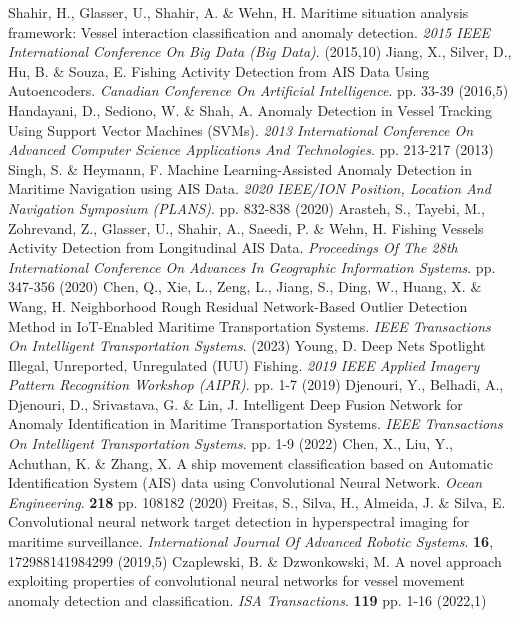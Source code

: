 Shahir, H., Glasser, U., Shahir, A. \& Wehn, H. Maritime situation analysis framework: Vessel interaction classification and anomaly detection. {\em 2015 IEEE International Conference On Big Data (Big Data)}. (2015,10)
Jiang, X., Silver, D., Hu, B. \& Souza, E. Fishing Activity Detection from AIS Data Using Autoencoders. {\em Canadian Conference On Artificial Intelligence}. pp. 33-39 (2016,5)
Handayani, D., Sediono, W. \& Shah, A. Anomaly Detection in Vessel Tracking Using Support Vector Machines (SVMs). {\em 2013 International Conference On Advanced Computer Science Applications And Technologies}. pp. 213-217 (2013)
Singh, S. \& Heymann, F. Machine Learning-Assisted Anomaly Detection in Maritime Navigation using AIS Data. {\em 2020 IEEE/ION Position, Location And Navigation Symposium (PLANS)}. pp. 832-838 (2020)
Arasteh, S., Tayebi, M., Zohrevand, Z., Glasser, U., Shahir, A., Saeedi, P. \& Wehn, H. Fishing Vessels Activity Detection from Longitudinal AIS Data. {\em Proceedings Of The 28th International Conference On Advances In Geographic Information Systems}. pp. 347-356 (2020)
Chen, Q., Xie, L., Zeng, L., Jiang, S., Ding, W., Huang, X. \& Wang, H. Neighborhood Rough Residual Network-Based Outlier Detection Method in IoT-Enabled Maritime Transportation Systems. {\em IEEE Transactions On Intelligent Transportation Systems}. (2023)
Young, D. Deep Nets Spotlight Illegal, Unreported, Unregulated (IUU) Fishing. {\em 2019 IEEE Applied Imagery Pattern Recognition Workshop (AIPR)}. pp. 1-7 (2019)
Djenouri, Y., Belhadi, A., Djenouri, D., Srivastava, G. \& Lin, J. Intelligent Deep Fusion Network for Anomaly Identification in Maritime Transportation Systems. {\em IEEE Transactions On Intelligent Transportation Systems}. pp. 1-9 (2022)
Chen, X., Liu, Y., Achuthan, K. \& Zhang, X. A ship movement classification based on Automatic Identification System (AIS) data using Convolutional Neural Network. {\em Ocean Engineering}. \textbf{218} pp. 108182 (2020)
Freitas, S., Silva, H., Almeida, J. \& Silva, E. Convolutional neural network target detection in hyperspectral imaging for maritime surveillance. {\em International Journal Of Advanced Robotic Systems}. \textbf{16}, 172988141984299 (2019,5)
Czaplewski, B. \& Dzwonkowski, M. A novel approach exploiting properties of convolutional neural networks for vessel movement anomaly detection and classification. {\em ISA Transactions}. \textbf{119} pp. 1-16 (2022,1)
